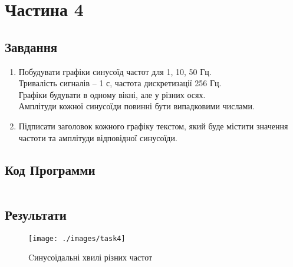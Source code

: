 \section{Частина 4}
\label{sec:task4}

\subsection{Завдання}
\label{subsec:task4_task}

\begin{enumerate}
    \item
          Побудувати графіки синусоїд частот для 1, 10, 50 Гц. \\
          Тривалість сигналів – 1 с, частота дискретизації 256 Гц. \\
          Графіки будувати в одному вікні, але у різних осях. \\
          Амплітуди кожної синусоїди повинні бути випадковими числами.

    \item
          Підписати заголовок кожного графіку текстом,
          який буде містити значення частоти та амплітуди відповідної синусоїди.
\end{enumerate}

\subsection{Код Программи}
\label{subsec:task4_code}
\inputminted{python}{../src/task4.py}

\subsection{Результати}
\label{subsec:task4_results}

\begin{figure}[!ht]
    \centering
    \texttt{[image: ./images/task4]}
    \caption{Cинусоїдальні хвилі різних частот}
    \label{fig:sine_waves}
\end{figure}
